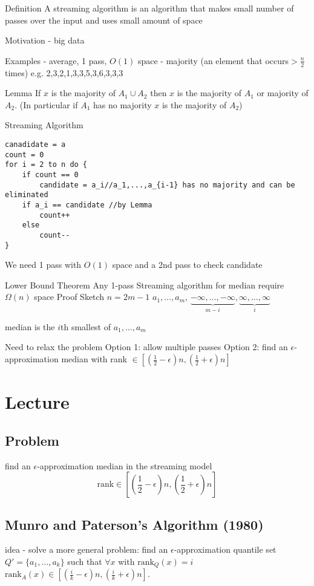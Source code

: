 \documentclass[english,12pt]{article}
\theoremstyle{plain}
\theoremstyle{definition}
\theoremstyle{definition} %
\begin{document}
Definition A streaming algorithm is an algorithm that makes small number of passes over the input and uses small amount of space

Motivation - big data

Examples - average, 1 pass, $O(1)$ space
- majority (an element that occurs$ >\frac{n}{2}$ times)
e.g. 2,3,2,1,3,3,5,3,6,3,3,3

Lemma If $x$ is the majority of $A_1\cup A_2$ then $x$ is the majority of $A_1$ or majority of $A_2$.  (In particular if $A_1$ has no majority $x$ is the majority of $A_2$)

Streaming Algorithm
\begin{verbatim}
canadidate = a
count = 0
for i = 2 to n do {
    if count == 0
        candidate = a_i//a_1,...,a_{i-1} has no majority and can be eliminated
    if a_i == candidate //by Lemma
        count++
    else
        count--
}
\end{verbatim}

We need 1 pass with $O(1)$ space and a 2nd pass to check candidate

Lower Bound Theorem Any 1-pass
Streaming algorithm for median
require $\Omega(n)$ space
Proof Sketch $n=2m-1$
$a_1,\ldots, a_m$, $\underbrace{-\infty, \ldots, -\infty}_{m-i},\underbrace{\infty, \ldots, \infty}_{i}$

median is the $i$th smallest of $a_1,\ldots, a_m$

Need to relax the problem
Option 1: allow multiple passes
Option 2: find an $\epsilon$-approximation median with rank $\in\left[\left(\frac{1}{2}-\epsilon\right) n, \left(\frac{1}{2}+\epsilon\right) n\right]$


\section{Lecture}
\subsection{Problem}
find an $\epsilon$-approximation median in the streaming model
\[\text{rank}\in\left[\left(\frac{1}{2}-\epsilon\right)n, \left(\frac{1}{2}+\epsilon\right)n\right]\]

\subsection{Munro and Paterson's Algorithm (1980)}
idea - solve a more general problem:
find an $\epsilon$-approximation quantile set $Q' = \{a_1,\ldots, a_k\}$ such that $\forall x$ with $\text{rank}_{Q}(x)=i$ $\text{rank}_A(x)\in \left[\left(\frac{i}{k}-\epsilon\right)n, \left(\frac{i}{k}+\epsilon\right)n\right]$.
\end{document}
